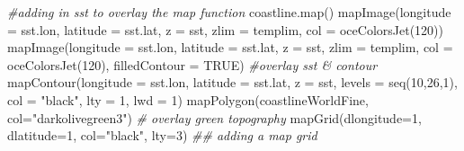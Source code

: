 \documentclass[]{tufte-handout}
\newenvironment{Shaded}{}{}
\newcommand{\AttributeTok}[1]{\textcolor[rgb]{0.49,0.56,0.16}{#1}}
\newcommand{\CommentTok}[1]{\textcolor[rgb]{0.38,0.63,0.69}{\textit{#1}}}
\newcommand{\ConstantTok}[1]{\textcolor[rgb]{0.53,0.00,0.00}{#1}}
\newcommand{\DecValTok}[1]{\textcolor[rgb]{0.25,0.63,0.44}{#1}}
\newcommand{\DocumentationTok}[1]{\textcolor[rgb]{0.73,0.13,0.13}{\textit{#1}}}
\newcommand{\FunctionTok}[1]{\textcolor[rgb]{0.02,0.16,0.49}{#1}}
\newcommand{\NormalTok}[1]{#1}
\newcommand{\StringTok}[1]{\textcolor[rgb]{0.25,0.44,0.63}{#1}}
\begin{document}
\begin{Shaded}
\begin{Highlighting}[]
\CommentTok{\#adding in sst to overlay the map function}
\FunctionTok{coastline.map}\NormalTok{()}
\FunctionTok{mapImage}\NormalTok{(}\AttributeTok{longitude =}\NormalTok{ sst.lon, }\AttributeTok{latitude =}\NormalTok{ sst.lat, }\AttributeTok{z =}\NormalTok{ sst, }\AttributeTok{zlim =}\NormalTok{ templim, }\AttributeTok{col =} \FunctionTok{oceColorsJet}\NormalTok{(}\DecValTok{120}\NormalTok{))}
\FunctionTok{mapImage}\NormalTok{(}\AttributeTok{longitude =}\NormalTok{ sst.lon, }\AttributeTok{latitude =}\NormalTok{ sst.lat, }\AttributeTok{z =}\NormalTok{ sst, }\AttributeTok{zlim =}\NormalTok{ templim, }\AttributeTok{col =} \FunctionTok{oceColorsJet}\NormalTok{(}\DecValTok{120}\NormalTok{), }\AttributeTok{filledContour =} \ConstantTok{TRUE}\NormalTok{)  }\CommentTok{\#overlay sst \& contour}
\FunctionTok{mapContour}\NormalTok{(}\AttributeTok{longitude =}\NormalTok{ sst.lon, }\AttributeTok{latitude =}\NormalTok{ sst.lat, }\AttributeTok{z =}\NormalTok{ sst, }\AttributeTok{levels =} \FunctionTok{seq}\NormalTok{(}\DecValTok{10}\NormalTok{,}\DecValTok{26}\NormalTok{,}\DecValTok{1}\NormalTok{),}
            \AttributeTok{col =} \StringTok{"black"}\NormalTok{, }\AttributeTok{lty =} \DecValTok{1}\NormalTok{, }\AttributeTok{lwd =} \DecValTok{1}\NormalTok{)}
\FunctionTok{mapPolygon}\NormalTok{(coastlineWorldFine, }\AttributeTok{col=}\StringTok{"darkolivegreen3"}\NormalTok{) }\CommentTok{\# overlay green topography}
\FunctionTok{mapGrid}\NormalTok{(}\AttributeTok{dlongitude=}\DecValTok{1}\NormalTok{, }\AttributeTok{dlatitude=}\DecValTok{1}\NormalTok{, }\AttributeTok{col=}\StringTok{"black"}\NormalTok{, }\AttributeTok{lty=}\DecValTok{3}\NormalTok{) }\DocumentationTok{\#\# adding a map grid}


\end{Highlighting}
\end{Shaded}
\end{document}
